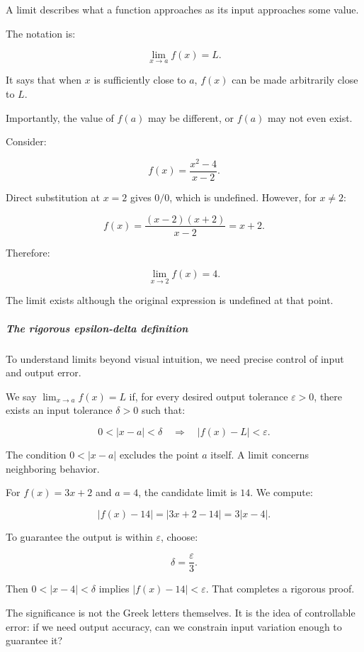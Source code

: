 A limit describes what a function approaches as its input approaches some value.

The notation is:

\[
\lim_{x\to a}f(x)=L.
\]

It says that when \(x\) is sufficiently close to \(a\), \(f(x)\) can be made arbitrarily close to \(L\).

Importantly, the value of \(f(a)\) may be different, or \(f(a)\) may not even exist.

Consider:

\[
f(x)=\frac{x^2-4}{x-2}.
\]

Direct substitution at \(x=2\) gives \(0/0\), which is undefined. However, for \(x\ne2\):

\[
f(x)=\frac{(x-2)(x+2)}{x-2}=x+2.
\]

Therefore:

\[
\boxed{\lim_{x\to2}f(x)=4}.
\]

The limit exists although the original expression is undefined at that point.

\subparagraph{The rigorous epsilon-delta definition}\label{01-foundations-i-ch020-the-rigorous-epsilon-delta-definition}

\hypertarget{01-foundations-i-ch020-the-rigorous-epsilon-delta-definition}{}

To understand limits beyond visual intuition, we need precise control of input and output error.

We say \(\lim_{x\to a}f(x)=L\) if, for every desired output tolerance \(\varepsilon>0\), there exists an input tolerance \(\delta>0\) such that:

\[
0<|x-a|<\delta \quad\Longrightarrow\quad |f(x)-L|<\varepsilon.
\]

The condition \(0<|x-a|\) excludes the point \(a\) itself. A limit concerns neighboring behavior.

For \(f(x)=3x+2\) and \(a=4\), the candidate limit is \(14\). We compute:

\[
|f(x)-14|=|3x+2-14|=3|x-4|.
\]

To guarantee the output is within \(\varepsilon\), choose:

\[
\delta=\frac{\varepsilon}{3}.
\]

Then \(0<|x-4|<\delta\) implies \(|f(x)-14|<\varepsilon\). That completes a rigorous proof.

The significance is not the Greek letters themselves. It is the idea of controllable error: if we need output accuracy, can we constrain input variation enough to guarantee it?

